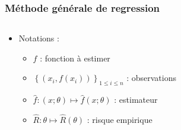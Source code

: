 \documentclass[c]{beamer}
\begin{document}
\begin{frame}
  \frametitle{M\'ethode g\'en\'erale de regression}

  \begin{columns}
    \begin{column}{.6\textwidth}
      \begin{itemize}
        \item Notations :
        \begin{itemize}
          \item<1-> $f$ : fonction à estimer
          \item<2-> $\left\{ \left( x_i, f(x_i) \right) \right\}_{1 \leq i \leq n}$ : observations
          \item<3-> $\hat{f} : (x; \theta) \mapsto \hat{f}(x; \theta)$ : estimateur
          \item<4-> $\hat{R} : \theta \mapsto \hat{R}(\theta)$ : risque empirique
        \end{itemize}
      \end{itemize}
    \end{column}
    \begin{column}{.4\textwidth}
        \begin{figure}
\end{figure}
\end{column}
\end{columns}
\end{frame}
\end{document}

